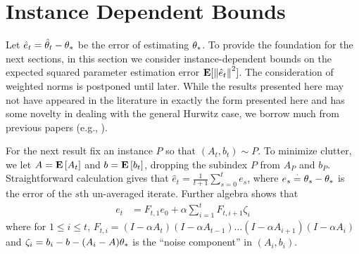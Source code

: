 \section{Instance Dependent Bounds}\label{sec:mainresults}
Let $\hat e_t = \hat \theta_t - \theta_*$ be the error of estimating $\theta_*$.
To provide the foundation for the next sections,
in this section we consider instance-dependent bounds on the expected squared parameter estimation error $\mathbf{E}[ \left\| \hat e_t\right\|^2 ]$. 
The consideration of weighted norms is postponed until later.
While the results presented here may not have appeared in the literature in exactly the form presented here
and has some novelty in dealing with the general Hurwitz case, 
we borrow much from previous papers (e.g., \cite{bach-moulines,polyak-judisky}). 
\iffalse
The core question is how the error depends on various instance-dependent quantities (variance of noise, spectral properties of matrices involved, the size of the initial error, etc.), how fast the error decreased over time.
As we shall see, if the constant step-size belongs to a small enough neighborhood of zero (the size of which depends on the instance), the error decreases at a rate of $O(1/t)$ and both too small and too large step-sizes are undesirable. The main result, \Cref{th:rate}, which bounds the error from above, is corroborated with a lower bound which shows that the upper bound is tight.
While the results of this section may not have appeared in this form in the literature, the steps of the analysis are quite standard and build on the results of \citet{bach}.\todoc{I think we should say who we are building on.}
\fi

\iffalse
We first show that any  CALSA scheme  achieves an error of size$O(\frac{1}{t})$ with instance dependent constants and
step-size (see \Cref{th:rate}). In the \Cref{sec:land,sec:rl}, we investigate conditions under which this instance dependence can be eliminated such that we have \emph{universal} step-size choice and \emph{uniform} rates.
As a first step, we need show that there exists an instance dependent step-size such that the iterates are stable. To this end, it is useful to look at the error (of un-averaged iterates) $e_t\eqdef\theta_t-\ts$ given as below:
\fi
For the next result fix an instance $P$ so that $(A_t,b_t)\sim P$. To minimize clutter, 
we let $A = \mathbf{E}\left[A_t\right]$ and $b = \mathbf{E}\left[b_t\right]$,
dropping the subindex $P$ from $A_P$ and $b_P$.
Straightforward calculation gives that $\hat e_t = \frac1{t+1} \sum_{s=0}^t e_s$, where
 $e_s\stackrel{\cdot}{=}\theta_s-\theta_*$ is the error of the $s$th un-averaged iterate. Further algebra shows that \begin{align}\label{eq:errrecmain}
e_t&=
F_{t,1} e_0 + 
\alpha \sum_{i=1}^t F_{t,i+1} \zeta_i
\end{align}
where for $1\le i \le t$,
$F_{t,i} = (I-\alpha A_t) (I-\alpha A_{t-1}) \dots (I-\alpha A_{i+1}) (I-\alpha A_i)$ and
$\zeta_i = b_i-b - (A_i -A)\theta_*$ is the ``noise component'' in $(A_i,b_i)$.

